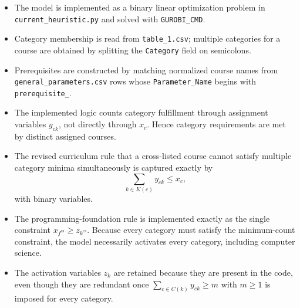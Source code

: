 \begin{itemize}
    \item The model is implemented as a binary linear optimization problem in \texttt{current\_heuristic.py} and solved with \texttt{GUROBI\_CMD}.
    \item Category membership is read from \texttt{table\_1.csv}; multiple categories for a course are obtained by splitting the \texttt{Category} field on semicolons.
    \item Prerequisites are constructed by matching normalized course names from \texttt{general\_parameters.csv} rows whose \texttt{Parameter\_Name} begins with \texttt{prerequisite\_}.
    \item The implemented logic counts category fulfillment through assignment variables $y_{ck}$, not directly through $x_c$. Hence category requirements are met by distinct assigned courses.
    \item The revised curriculum rule that a cross-listed course cannot satisfy multiple category minima simultaneously is captured exactly by
    \[
    \sum_{k \in K(c)} y_{ck} \le x_c,
    \]
    with binary variables.
    \item The programming-foundation rule is implemented exactly as the single constraint $x_{f^{\text{cs}}} \ge z_{k^{\text{cs}}}$. Because every category must satisfy the minimum-count constraint, the model necessarily activates every category, including computer science.
    \item The activation variables $z_k$ are retained because they are present in the code, even though they are redundant once $\sum_{c \in C(k)} y_{ck} \ge m$ with $m \ge 1$ is imposed for every category.
\end{itemize}
